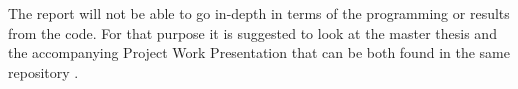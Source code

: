 The report will not be able to go in-depth in terms of the programming or results from the code. 
For that purpose it is suggested to look at the master thesis and the accompanying Project Work Presentation that can be both found in the same repository \cite{selfDocument}.